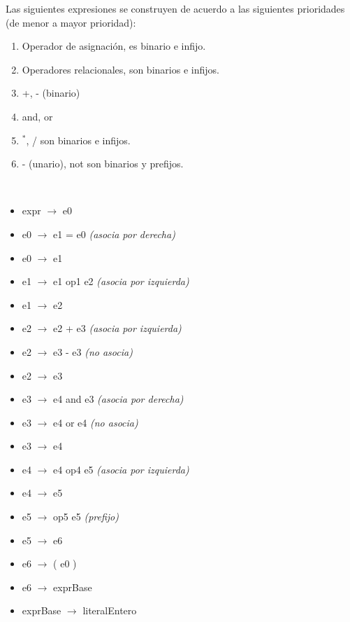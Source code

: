 \documentclass[11pt]{article}
\begin{document}
            Las siguientes expresiones se construyen de acuerdo a las siguientes prioridades (de menor a mayor prioridad):
            \begin{enumerate}
                \item Operador de asignación, es binario e infijo. 
                \item Operadores relacionales, son binarios e infijos.
                \item +, - (binario)
                \item and, or
                \item $^{\ast}$, / son binarios e infijos.
                \item - (unario), not son binarios y prefijos.
            \end{enumerate}
            \
            \begin{itemize}
                \item expr $\rightarrow$ e0
                \item e0 $\rightarrow$ e1 = e0 \textit{(asocia por derecha)}
                \item e0 $\rightarrow$ e1
                \item e1 $\rightarrow$ e1 op1 e2 \textit{(asocia por izquierda)}
                \item e1 $\rightarrow$ e2
                \item e2 $\rightarrow$ e2 + e3 \textit{(asocia por izquierda)}
                \item e2 $\rightarrow$ e3 - e3 \textit{(no asocia)}
                \item e2 $\rightarrow$ e3
                \item e3 $\rightarrow$ e4 and e3 \textit{(asocia por derecha)}
                \item e3 $\rightarrow$ e4 or e4 \textit{(no asocia)}
                \item e3 $\rightarrow$ e4
                \item e4 $\rightarrow$ e4 op4 e5 \textit{(asocia por izquierda)}
                \item e4 $\rightarrow$ e5
                \item e5 $\rightarrow$ op5 e5 \textit{(prefijo)}
                \item e5 $\rightarrow$ e6
                \item e6 $\rightarrow$ ( e0 )
                \item e6 $\rightarrow$ exprBase
                \item exprBase $\rightarrow$ literalEntero

\end{itemize}
\end{document}
